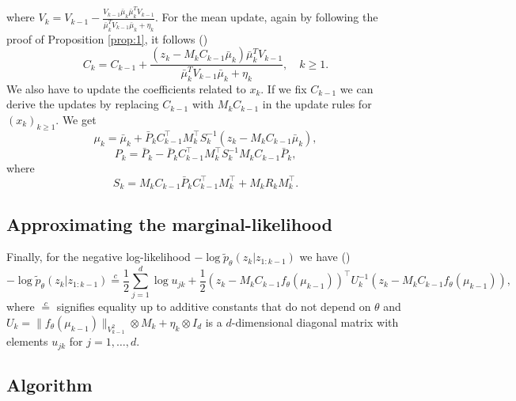 \documentclass{mldsmsc}
\begin{document}
\noindent where $V_k = V_{k-1} - \frac{V_{k-1} \bar{\mu}_k \bar{\mu}^T_k V_{k-1}}{\bar{\mu}_k^T V_{k-1} \bar{\mu}_k + \eta_k}$. \newline
For the mean update, again by following the proof of Proposition \ref{prop:1}, it follows (\cite{akyildiz2021probabilistic})
\begin{equation}
    C_k = C_{k-1} + \frac{\left( z_k - M_k C_{k-1} \bar{\mu}_k \right) \bar{\mu}_k^T V_{k-1}}{\bar{\mu}_k^T V_{k-1} \bar{\mu}_k + \eta_k}, \quad k \geq 1.
\end{equation}
We also have to update the coefficients related to $x_k$. If we fix \(C_{k-1}\) we can derive the updates by replacing \(C_{k-1}\) with \(M_k C_{k-1}\) in the update rules for \((x_k)_{k \geq 1}\). We get
\begin{equation}
    \mu_k = \bar{\mu}_k + \bar{P}_k C_{k-1}^\top M_k^\top S_k^{-1} (z_k - M_k C_{k-1} \bar{\mu}_k),
\end{equation}
\begin{equation}
    P_k = \bar{P}_k - \bar{P}_k C_{k-1}^\top M_k^\top S_k^{-1} M_k C_{k-1} \bar{P}_k,
\end{equation}
where 
\begin{equation}
    S_k = M_k C_{k-1} \bar{P}_k C_{k-1}^\top M_k^\top + M_k R_k M_k^\top.
\end{equation}

\subsection{Approximating the marginal-likelihood}

Finally, for the negative log-likelihood \(-\log \tilde{p}_\theta (z_k | z_{1:k-1})\) we have (\cite{akyildiz2021probabilistic})
\begin{equation}
-\log \tilde{p}_\theta (z_k | z_{1:k-1}) \overset{c}{=} \frac{1}{2} \sum_{j=1}^{d} \log u_{jk} + \frac{1}{2} (z_k - M_k C_{k-1} f_\theta(\mu_{k-1}))^\top U_k^{-1} (z_k - M_k C_{k-1} f_\theta(\mu_{k-1})),
\end{equation}
where \(\overset{c}{=}\) signifies equality up to additive constants that do not depend on $\theta$ and \(U_k = \|f_\theta(\mu_{k-1})\|_{V_{k-1}^2} \otimes M_k + \eta_k \otimes I_d\) is a \(d\)-dimensional diagonal matrix with elements \(u_{jk}\) for \(j = 1, \ldots, d\). \newline

\subsection{Algorithm}
\end{document}
